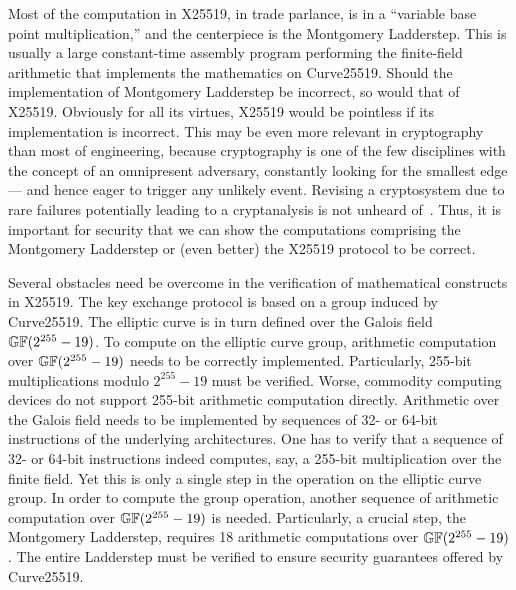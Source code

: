 Most of the computation in X25519, in trade parlance, is in a
``variable base point multiplication,'' and the centerpiece 
is the Montgomery Ladderstep. This is usually a
large constant-time assembly program performing the
finite-field arithmetic that implements the mathematics on Curve25519.
Should the implementation of Montgomery Ladderstep be incorrect, so
would that of X25519. Obviously for all its virtues, X25519 would be
pointless if its implementation is incorrect. This may be even more
relevant in cryptography than most of engineering, because cryptography is
one of the few disciplines with the concept of an omnipresent
adversary, constantly looking for the smallest edge --- and hence
eager to trigger any unlikely event. Revising a cryptosystem
due to rare failures potentially leading to a cryptanalysis is not
unheard of~\cite{HNPPSSW:03:IDFSNE}.
Thus, it is important for security that we can show the computations
comprising the Montgomery Ladderstep or (even better) the X25519
protocol to be correct. 

Several obstacles need be overcome in the verification of mathematical
constructs in X25519. The key exchange protocol is based on a
group induced by Curve25519. The elliptic
curve is in turn defined over the Galois field $\mathbb{GF}(2^{255} - 19)$. 
To compute on the elliptic curve group, arithmetic computation over
$\mathbb{GF}(2^{255} - 19)$ needs to be correctly implemented. 
Particularly, 255-bit multiplications modulo
$2^{255} - 19$ must be verified. Worse, commodity computing devices do
not support 255-bit arithmetic computation directly. Arithmetic over
the Galois field needs to be implemented by sequences of 32- or 64-bit
instructions of the underlying architectures. One has to
verify that a sequence of 32- or 64-bit instructions indeed
computes, say, a 255-bit multiplication over the finite field. Yet this
is only a single step in the operation on the elliptic curve group.
In order to compute the group operation, another sequence of
arithmetic computation over $\mathbb{GF}(2^{255} - 19)$ is
needed. Particularly, a crucial step,
the Montgomery Ladderstep, requires 18 arithmetic 
computations over $\mathbb{GF}(2^{255} - 19)$. The entire Ladderstep must be
verified to ensure security guarantees offered by Curve25519.


